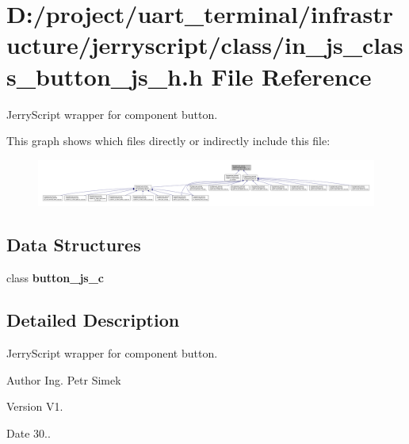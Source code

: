 \section{D\+:/project/uart\+\_\+terminal/infrastructure/jerryscript/class/in\+\_\+js\+\_\+class\+\_\+button\+\_\+js\+\_\+h.h File Reference}
\label{in__js__class__button__js__h_8h}


Jerry\+Script wrapper for component button.  


This graph shows which files directly or indirectly include this file\+:\nopagebreak
\begin{figure}[H]
\begin{center}
\leavevmode
\includegraphics[width=350pt]{in__js__class__button__js__h_8h__dep__incl}
\end{center}
\end{figure}
\subsection*{Data Structures}
\begin{DoxyCompactItemize}
\item 
class \textbf{ button\+\_\+js\+\_\+c}
\end{DoxyCompactItemize}


\subsection{Detailed Description}
Jerry\+Script wrapper for component button. 

\begin{DoxyAuthor}{Author}
Ing. Petr Simek 
\end{DoxyAuthor}
\begin{DoxyVersion}{Version}
V1. 
\end{DoxyVersion}
\begin{DoxyDate}{Date}
30.. 
\end{DoxyDate}
